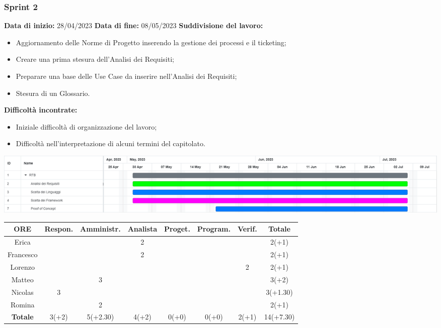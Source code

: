 \documentclass[a4paper, 12pt]{article}
\begin{document}
\subsubsection{Sprint 2}
\textbf{Data di inizio:} 28/04/2023\newline
\textbf{Data di fine:} 08/05/2023\newline
\newline
\textbf{Suddivisione del lavoro:}
\begin{itemize}
    \item Aggiornamento delle Norme di Progetto inserendo la gestione dei processi e il ticketing;
    \item Creare una prima stesura dell'Analisi dei Requisiti;
    \item Preparare una base delle Use Case da inserire nell'Analisi dei Requisiti;
    \item Stesura di un Glossario.
\end{itemize}
\textbf{Difficoltà incontrate:}
\begin{itemize}
    \item Iniziale difficoltà di organizzazione del lavoro;
    \item Difficoltà nell'interpretazione di alcuni termini  del capitolato.
\end{itemize}
\includegraphics[scale=0.24]{RTB_1.png}\newline
\newline
\begin{tabular}{|c|c|c|c|c|c|c|c|}
    \hline
    \textbf{ORE} & \textbf{Respon.} & \textbf{Amministr.} & \textbf{Analista} & \textbf{Proget.} & \textbf{Program.} & \textbf{Verif.} & \textbf{Totale}\\
    \hline
    Erica & & & 2 & & & & 2(+1)\\
    \hline
    Francesco & & & 2 & & & & 2(+1)\\
    \hline
    Lorenzo & & & & & & 2 & 2(+1)\\
    \hline
    Matteo & & 3 & & & & & 3(+2)\\
    \hline
    Nicolas & 3 & & & & & & 3(+1.30)\\
    \hline
    Romina & & 2 & & & & & 2(+1)\\
    \hline
    \textbf{Totale} & 3(+2) & 5(+2.30) & 4(+2) & 0(+0) & 0(+0) & 2(+1) & 14(+7.30)\\
    \hline
\end{tabular}\\[8pt]
\end{document}
